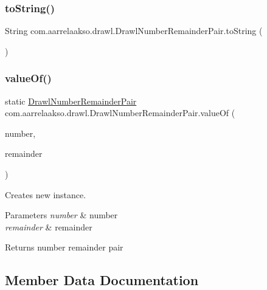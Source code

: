 \subsubsection{\texorpdfstring{to\+String()}{toString()}}
{\footnotesize\ttfamily String com.\+aarrelaakso.\+drawl.\+Drawl\+Number\+Remainder\+Pair.\+to\+String (\begin{DoxyParamCaption}{ }\end{DoxyParamCaption})}

\mbox{\label{classcom_1_1aarrelaakso_1_1drawl_1_1_drawl_number_remainder_pair_acf215ec7af4d8663e2cc0f6691b59d57}} 
\subsubsection{\texorpdfstring{value\+Of()}{valueOf()}}
{\footnotesize\ttfamily static \hyperlink{classcom_1_1aarrelaakso_1_1drawl_1_1_drawl_number_remainder_pair}{Drawl\+Number\+Remainder\+Pair} com.\+aarrelaakso.\+drawl.\+Drawl\+Number\+Remainder\+Pair.\+value\+Of (\begin{DoxyParamCaption}\item[{\hyperlink{classcom_1_1aarrelaakso_1_1drawl_1_1_drawl_number}{Drawl\+Number}}]{number,  }\item[{\hyperlink{classcom_1_1aarrelaakso_1_1drawl_1_1_drawl_number}{Drawl\+Number}}]{remainder }\end{DoxyParamCaption})\hspace{0.3cm}{\ttfamily [static]}}



Creates new instance. 


\begin{DoxyParams}{Parameters}
{\em number} & number \\
\hline
{\em remainder} & remainder \\
\hline
\end{DoxyParams}
\begin{DoxyReturn}{Returns}
number remainder pair 
\end{DoxyReturn}


\subsection{Member Data Documentation}
\mbox{\label{classcom_1_1aarrelaakso_1_1drawl_1_1_drawl_number_remainder_pair_a8c62602c155e6b1fe737605fe7229b36}} 
